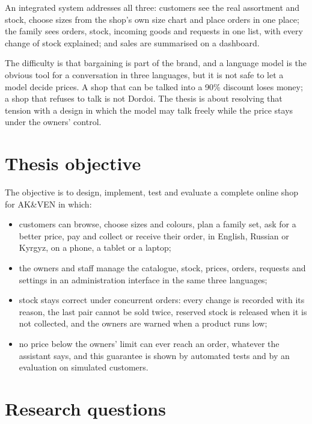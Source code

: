 An integrated system addresses all three: customers see the real assortment and stock, choose sizes from the shop's
own size chart and place orders in one place; the family sees orders, stock, incoming goods and requests in one list,
with every change of stock explained; and sales are summarised on a dashboard.

The difficulty is that bargaining is part of the brand, and a language model is the obvious tool for a conversation in
three languages, but it is not safe to let a model decide prices. A shop that can be talked into a 90\% discount loses
money; a shop that refuses to talk is not Dordoi. The thesis is about resolving that tension with a design in which
the model may talk freely while the price stays under the owners' control.

\section{Thesis objective}

The objective is to design, implement, test and evaluate a complete online shop for AK\&VEN in which:
\begin{itemize}
	\item customers can browse, choose sizes and colours, plan a family set, ask for a better price, pay and collect or
	receive their order, in English, Russian or Kyrgyz, on a phone, a tablet or a laptop;
	\item the owners and staff manage the catalogue, stock, prices, orders, requests and settings in an administration
	interface in the same three languages;
	\item stock stays correct under concurrent orders: every change is recorded with its reason, the last pair cannot
	be sold twice, reserved stock is released when it is not collected, and the owners are warned when a product runs
	low;
	\item no price below the owners' limit can ever reach an order, whatever the assistant says, and this guarantee is
	shown by automated tests and by an evaluation on simulated customers.
\end{itemize}

\section{Research questions}
\label{sec:rq}


